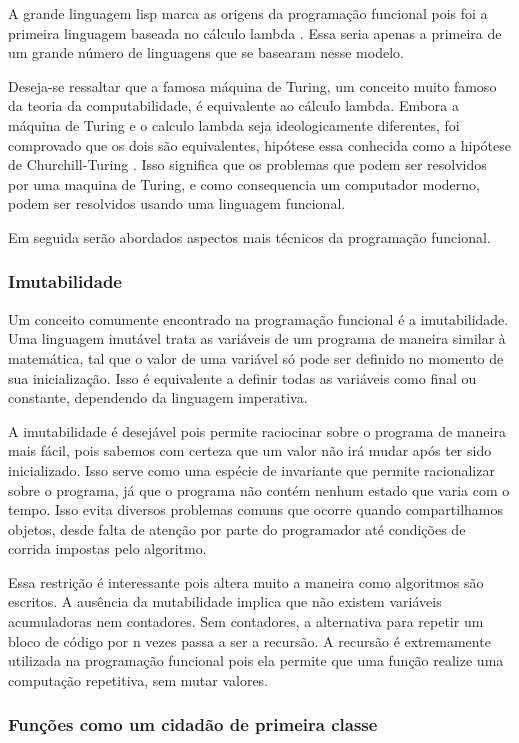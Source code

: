 A grande linguagem lisp marca as origens da programação funcional pois foi a primeira linguagem baseada no cálculo lambda \cite{graham}.
Essa seria apenas a primeira de um grande número de linguagens que se basearam nesse modelo.

Deseja-se ressaltar que a famosa máquina de Turing, um conceito muito famoso da teoria da computabilidade, é equivalente ao cálculo lambda.
Embora a máquina de Turing e o calculo lambda seja ideologicamente diferentes, foi comprovado que os dois são equivalentes, hipótese essa conhecida como a hipótese de Churchill-Turing \cite{computability}.
Isso significa que os problemas que podem ser resolvidos por uma maquina de Turing, e como consequencia um computador moderno, podem ser resolvidos usando uma linguagem funcional.

Em seguida serão abordados aspectos mais técnicos da programação funcional.

\subsubsection{Imutabilidade}

Um conceito comumente encontrado na programação funcional é a imutabilidade.
Uma linguagem imutável trata as variáveis de um programa de maneira similar à matemática, tal que o valor de uma variável só pode ser definido no momento de sua inicialização. 
Isso é equivalente a definir todas as variáveis como final ou constante, dependendo da linguagem imperativa.

A imutabilidade é desejável pois permite raciocinar sobre o programa de maneira mais fácil, pois sabemos com certeza que um valor não irá mudar após ter sido inicializado.
Isso serve como uma espécie de invariante que permite racionalizar sobre o programa, já que o programa não contém nenhum estado que varia com o tempo.
Isso evita diversos problemas comuns que ocorre quando compartilhamos objetos, desde falta de atenção por parte do programador até condições de corrida impostas pelo algoritmo.

Essa restrição é interessante pois altera muito a maneira como algoritmos são escritos.
A ausência da mutabilidade implica que não existem variáveis acumuladoras nem contadores.
Sem contadores, a alternativa para repetir um bloco de código por n vezes passa a ser a recursão.
A recursão é extremamente utilizada na programação funcional pois ela permite que uma função realize uma computação repetitiva, sem mutar valores.

\subsubsection{Funções como um cidadão de primeira classe}

